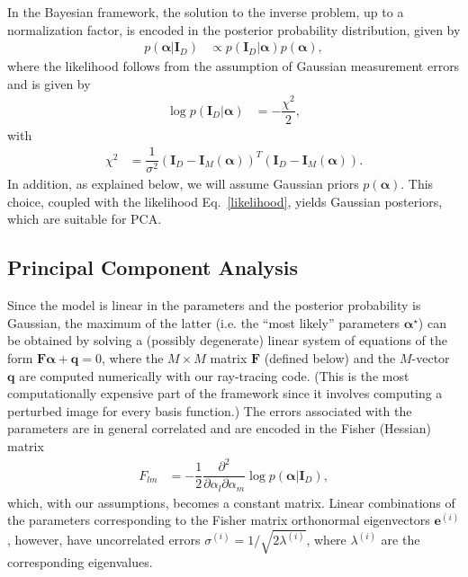 \documentclass[%
nofootinbib,
 amsmath,amssymb,
 aps,
floatfix,
twocolumn
]{revtex4-2}
\begin{document}
In the Bayesian framework, the solution to the inverse problem, up to a normalization factor, is encoded in the posterior probability distribution, given by
%
\begin{align} \label{eq: BayesTheorem}
    p\left(\boldsymbol{\alpha} \lvert \boldsymbol{I}_D\right) & \propto p\left(\boldsymbol{I}_D \lvert \boldsymbol{\alpha} \right) p\left(\boldsymbol{\alpha}\right),
\end{align}
where the likelihood follows from the assumption of Gaussian measurement errors and is given by
%
\begin{align} \label{eq: Likelihood}
    \log p\left(\boldsymbol{I}_D \lvert \boldsymbol{\alpha} \right) & = - \dfrac{\chi^2}{2}, 
\end{align}
with
%
\begin{align}
    \chi^2 & = \dfrac{1}{\sigma^2}\left( \boldsymbol{I}_D - \boldsymbol{I}_M \left(\boldsymbol{\alpha}\right) \right)^T \left( \boldsymbol{I}_D - \boldsymbol{I}_M \left(\boldsymbol{\alpha}\right)\right).\label{likelihood}
\end{align}
%
In addition, as explained below, we will assume Gaussian priors \(p \left(\boldsymbol{\alpha}\right)\). This choice, coupled with the likelihood Eq.~\eqref{likelihood}, yields Gaussian posteriors, which are suitable for PCA.

\subsection{Principal Component Analysis}\label{method_pca}

Since the model is linear in the parameters and the posterior probability is Gaussian, the maximum of the latter (i.e. the ``most likely'' parameters \(\boldsymbol{\alpha}^\star\)) can be obtained by solving a (possibly degenerate) linear system of equations of the form \(\boldsymbol{F} \boldsymbol{\alpha}+\boldsymbol{q} = 0\), where the \(M\times M\) matrix \(\boldsymbol{F}\) (defined below) and the \(M\)-vector \(\boldsymbol{q}\) are computed numerically with our ray-tracing code. (This is the most computationally expensive part of the framework since it involves computing a perturbed image for every basis function.)
%
The errors associated with the parameters are in general correlated and are encoded in the Fisher (Hessian) matrix 
%
\begin{align} \label{eq: FisherMatrix}
    F_{lm} & = - \dfrac{1}{2}\dfrac{\partial^2}{\partial \alpha_l \partial \alpha_m} \log   p\left(\boldsymbol{\alpha} \lvert \boldsymbol{I}_D\right),
\end{align}
%
which, with our assumptions, becomes a constant matrix.
%
Linear combinations of the parameters corresponding to the Fisher matrix orthonormal eigenvectors \(\boldsymbol{e}^{(i)}\), however, have uncorrelated errors \(\sigma^{(i)} = 1/\sqrt{2\lambda^{(i)}} \), where \(\lambda^{(i)}\) are the corresponding eigenvalues. 
%
\end{document}
